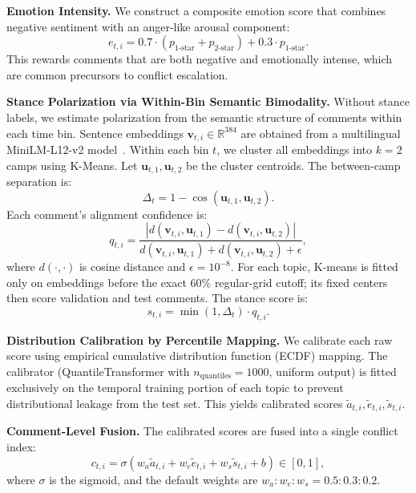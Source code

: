 \documentclass[11pt,a4paper]{article}
\begin{document}
\textbf{Emotion Intensity.} We construct a composite emotion score that combines negative sentiment with an anger-like arousal component:
\begin{equation}
e_{t,i} = 0.7 \cdot (p_{\text{1-star}} + p_{\text{2-star}}) + 0.3 \cdot p_{\text{1-star}}.
\label{eq:emotion_score}
\end{equation}
This rewards comments that are both negative and emotionally intense, which are common precursors to conflict escalation.

\textbf{Stance Polarization via Within-Bin Semantic Bimodality.} Without stance labels, we estimate polarization from the semantic structure of comments within each time bin. Sentence embeddings $\mathbf{v}_{t,i} \in \mathbb{R}^{384}$ are obtained from a multilingual MiniLM-L12-v2 model~\cite{wang2020minilm}. Within each bin $t$, we cluster all embeddings into $k{=}2$ camps using K-Means. Let $\mathbf{u}_{t,1}, \mathbf{u}_{t,2}$ be the cluster centroids. The between-camp separation is:
\begin{equation}
\Delta_t = 1 - \cos(\mathbf{u}_{t,1}, \mathbf{u}_{t,2}).
\label{eq:camp_separation}
\end{equation}
Each comment's alignment confidence is:
\begin{equation}
q_{t,i} = \frac{|d(\mathbf{v}_{t,i}, \mathbf{u}_{t,1}) - d(\mathbf{v}_{t,i}, \mathbf{u}_{t,2})|}{d(\mathbf{v}_{t,i}, \mathbf{u}_{t,1}) + d(\mathbf{v}_{t,i}, \mathbf{u}_{t,2}) + \epsilon},
\label{eq:alignment_confidence}
\end{equation}
where $d(\cdot,\cdot)$ is cosine distance and $\epsilon = 10^{-8}$. For each topic, K-means is fitted only on embeddings before the exact 60\% regular-grid cutoff; its fixed centers then score validation and test comments. The stance score is:
\begin{equation}
s_{t,i} = \min(1, \Delta_t) \cdot q_{t,i}.
\label{eq:stance_score}
\end{equation}

\textbf{Distribution Calibration by Percentile Mapping.} We calibrate each raw score using empirical cumulative distribution function (ECDF) mapping. The calibrator (QuantileTransformer with $n_{\text{quantiles}}=1000$, uniform output) is fitted exclusively on the temporal training portion of each topic to prevent distributional leakage from the test set. This yields calibrated scores $\tilde{a}_{t,i}, \tilde{e}_{t,i}, \tilde{s}_{t,i}$.

\textbf{Comment-Level Fusion.} The calibrated scores are fused into a single conflict index:
\begin{equation}
c_{t,i} = \sigma\!\left(w_a \tilde{a}_{t,i} + w_e \tilde{e}_{t,i} + w_s \tilde{s}_{t,i} + b\right) \in [0,1],
\label{eq:conflict_index_fusion}
\end{equation}
where $\sigma$ is the sigmoid, and the default weights are $w_a:w_e:w_s = 0.5:0.3:0.2$.
\end{document}
